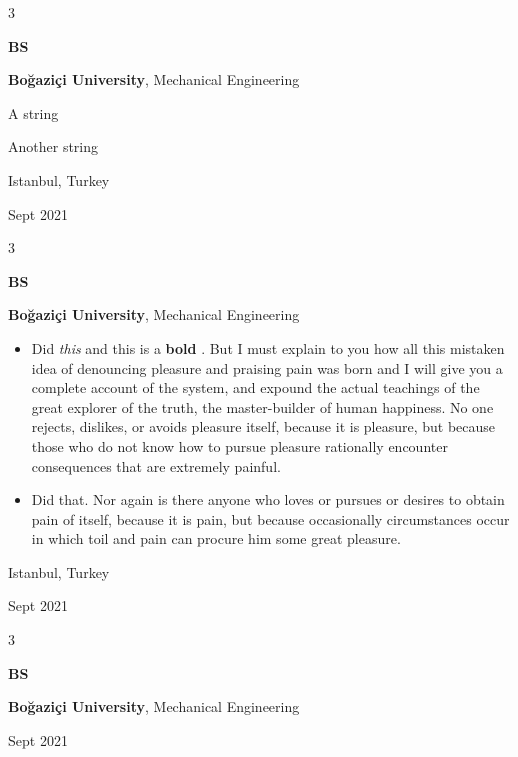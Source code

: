 \documentclass[10pt, letterpaper]{article}
\newenvironment{summary}{
    \begin{description}[
        topsep=0.10 cm,
        parsep=0.10 cm,
        partopsep=0pt,
        itemsep=0pt,
        leftmargin=0.4 cm + 10pt
    ]
}{
    \end{description}
} %
\newenvironment{highlights}{
    \begin{itemize}[
        topsep=0.10 cm,
        parsep=0.10 cm,
        partopsep=0pt,
        itemsep=0pt,
        leftmargin=0.4 cm + 10pt
    ]
}{
    \end{itemize}
} %
\newenvironment{threecolentry}[3][]{
    \onecolentry
    \def\thirdColumn{#3}
    \setcolumnwidth{1 cm, \fill, 4.5 cm}
    \begin{paracol}{3}
    {\raggedright #2} \switchcolumn
}{
    \switchcolumn \raggedleft \thirdColumn
    \end{paracol}
    \endonecolentry
} %
\let\hrefWithoutArrow\href
\renewcommand{\href}[2]{\hrefWithoutArrow{#1}{\ifthenelse{\equal{#2}{}}{ }{#2 }\raisebox{.15ex}{\footnotesize \faExternalLink*}}}
\begin{document}
        \vspace{0.2 cm}

        \begin{threecolentry}{\textbf{BS}}{
            Istanbul, Turkey

        Sept 2021
        }
            \textbf{Boğaziçi University}, Mechanical Engineering
            \begin{summary}
                \item A string
                \item Another string
            \end{summary}
        \end{threecolentry}

        \vspace{0.2 cm}

        \begin{threecolentry}{\textbf{BS}}{
            Istanbul, Turkey

        Sept 2021
        }
            \textbf{Boğaziçi University}, Mechanical Engineering
            \begin{highlights}
                \item Did \textit{this} and this is a \textbf{bold} \href{https://example.com}{link}. But I must explain to you how all this mistaken idea of denouncing pleasure and praising pain was born and I will give you a complete account of the system, and expound the actual teachings of the great explorer of the truth, the master-builder of human happiness. No one rejects, dislikes, or avoids pleasure itself, because it is pleasure, but because those who do not know how to pursue pleasure rationally encounter consequences that are extremely painful.
                \item Did that. Nor again is there anyone who loves or pursues or desires to obtain pain of itself, because it is pain, but because occasionally circumstances occur in which toil and pain can procure him some great pleasure.
            \end{highlights}
        \end{threecolentry}

        \vspace{0.2 cm}

        \begin{threecolentry}{\textbf{BS}}{
            Sept 2021
        }
            \textbf{Boğaziçi University}, Mechanical Engineering
        \end{threecolentry}
\end{document}
